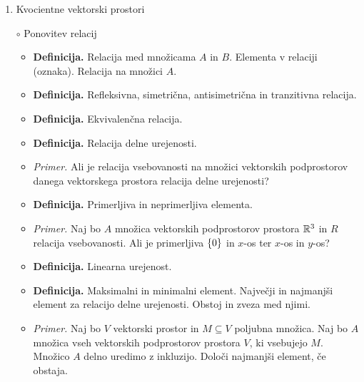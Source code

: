 \begin{enumerate}
    \item Kvocientne vektorski prostori
    \item[$\circ$] Ponovitev relacij
    \begin{itemize}
        \item \colorbox{purple!30}{\textbf{Definicija.}} Relacija med množicama $A$ in $B$. Elementa v relaciji (oznaka). Relacija na množici $A$.
        \item \colorbox{purple!30}{\textbf{Definicija.}} Refleksivna, simetrična, antisimetrična in tranzitivna relacija.
        \item \colorbox{purple!30}{\textbf{Definicija.}} Ekvivalenčna relacija.
        \item \colorbox{purple!30}{\textbf{Definicija.}} Relacija delne urejenosti.
        \item \colorbox{yellow!30}{\emph{Primer.}} Ali je relacija vsebovanosti na množici vektorskih podprostorov danega vektorskega prostora relacija delne urejenosti?        
        \item \colorbox{purple!30}{\textbf{Definicija.}} Primerljiva in neprimerljiva elementa.
        \item \colorbox{yellow!30}{\emph{Primer.}} Naj bo $A$ množica vektorskih podprostorov prostora $\mathbb{R}^3$ in $R$ relacija vsebovanosti. Ali je primerljiva $\left\{0\right\}$ in $x$-os ter $x$-os in $y$-os?
        \item \colorbox{purple!30}{\textbf{Definicija.}} Linearna urejenost.
        \item \colorbox{purple!30}{\textbf{Definicija.}} Maksimalni in minimalni element. Največji in najmanjši element za relacijo delne urejenosti. Obstoj in zveza med njimi.
        \item \colorbox{yellow!30}{\emph{Primer.}} Naj bo $V$ vektorski prostor in $M \subseteq V$ poljubna množica. Naj bo $A$ množica vseh vektorskih podprostorov prostora $V$, ki vsebujejo $M$. Množico $A$ delno uredimo z inkluzijo. Določi najmanjši element, če obstaja.
    \end{itemize}


\end{enumerate}

